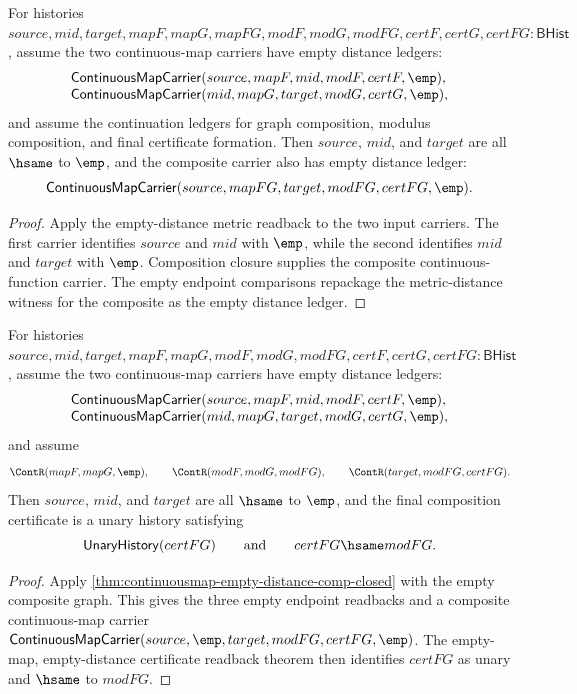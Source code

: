 \begin{theorem}
\label{thm:continuousmap-empty-distance-comp-closed}
For histories
$source,mid,target,mapF,mapG,mapFG,modF,modG,modFG,certF,certG,certFG:\mathsf{BHist}$,
assume the two continuous-map carriers have empty distance ledgers:
$$
\begin{array}{l}
\mathsf{ContinuousMapCarrier}(source,mapF,mid,modF,certF,\emp),\\
\mathsf{ContinuousMapCarrier}(mid,mapG,target,modG,certG,\emp),
\end{array}
$$
and assume the continuation ledgers for graph composition, modulus
composition, and final certificate formation. Then $source$, $mid$, and
$target$ are all $\hsame$ to $\emp$, and the composite carrier also has empty
distance ledger:
$$
\mathsf{ContinuousMapCarrier}(source,mapFG,target,modFG,certFG,\emp).
$$
\end{theorem}
\begin{proof}
Apply the empty-distance metric readback to the two input carriers. The first
carrier identifies $source$ and $mid$ with $\emp$, while the second identifies
$mid$ and $target$ with $\emp$. Composition closure supplies the composite
continuous-function carrier. The empty endpoint comparisons repackage the
metric-distance witness for the composite as the empty distance ledger.
\end{proof}

\begin{theorem}
\label{thm:continuousmap-empty-distance-empty-graph-comp-certificate-readback}
For histories
$source,mid,target,mapF,mapG,modF,modG,modFG,certF,certG,certFG:\mathsf{BHist}$,
assume the two continuous-map carriers have empty distance ledgers:
$$
\begin{array}{l}
\mathsf{ContinuousMapCarrier}(source,mapF,mid,modF,certF,\emp),\\
\mathsf{ContinuousMapCarrier}(mid,mapG,target,modG,certG,\emp),
\end{array}
$$
and assume
$$
\ContR(mapF,mapG,\emp),\qquad
\ContR(modF,modG,modFG),\qquad
\ContR(target,modFG,certFG).
$$
Then $source$, $mid$, and $target$ are all $\hsame$ to $\emp$, and the final
composition certificate is a unary history satisfying
$$
\mathsf{UnaryHistory}(certFG)\qquad\hbox{and}\qquad certFG\hsame modFG.
$$
\end{theorem}
\begin{proof}
Apply \autoref{thm:continuousmap-empty-distance-comp-closed} with the empty
composite graph. This gives the three empty endpoint readbacks and a composite
continuous-map carrier
$\mathsf{ContinuousMapCarrier}(source,\emp,target,modFG,certFG,\emp)$.
The empty-map, empty-distance certificate readback theorem then identifies
$certFG$ as unary and $\hsame$ to $modFG$.
\end{proof}

